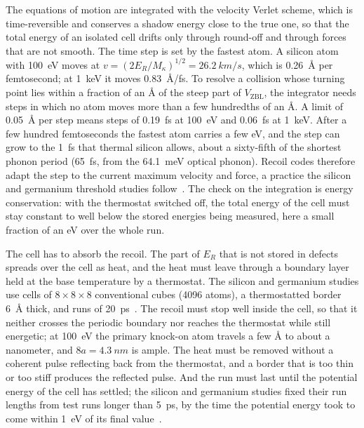 The equations of motion are integrated with the velocity Verlet scheme, which is time-reversible and conserves a shadow energy close to the true one, so that the total energy of an isolated cell drifts only through round-off and through forces that are not smooth. The time step is set by the fastest atom. A silicon atom with \SI{100}{eV} moves at $v = (2E_R/M_\kappa)^{1/2} = \SI{26.2}{km/s}$, which is \SI{0.26}{\angstrom} per femtosecond; at \SI{1}{keV} it moves \SI{0.83}{\angstrom/fs}. To resolve a collision whose turning point lies within a fraction of an \si{\angstrom} of the steep part of $V_{\mathrm{ZBL}}$, the integrator needs steps in which no atom moves more than a few hundredths of an \si{\angstrom}. A limit of \SI{0.05}{\angstrom} per step means steps of \SI{0.19}{fs} at \SI{100}{eV} and \SI{0.06}{fs} at \SI{1}{keV}. After a few hundred femtoseconds the fastest atom carries a few eV, and the step can grow to the \SI{1}{fs} that thermal silicon allows, about a sixty-fifth of the shortest phonon period (\SI{65}{fs}, from the \SI{64.1}{meV} optical phonon). Recoil codes therefore adapt the step to the current maximum velocity and force, a practice the silicon and germanium threshold studies follow~\cite[Table~I]{sassi2022energy}. The check on the integration is energy conservation: with the thermostat switched off, the total energy of the cell must stay constant to well below the stored energies being measured, here a small fraction of an eV over the whole run.

The cell has to absorb the recoil. The part of $E_R$ that is not stored in defects spreads over the cell as heat, and the heat must leave through a boundary layer held at the base temperature by a thermostat. The silicon and germanium studies use cells of $8\times8\times8$ conventional cubes (4096 atoms), a thermostatted border \SI{6}{\angstrom} thick, and runs of \SI{20}{ps}~\cite[Sect.~II\,A and Table~I]{sassi2022energy}. The recoil must stop well inside the cell, so that it neither crosses the periodic boundary nor reaches the thermostat while still energetic; at \SI{100}{eV} the primary knock-on atom travels a few \si{\angstrom} to about a nanometer, and $8a = \SI{4.3}{nm}$ is ample. The heat must be removed without a coherent pulse reflecting back from the thermostat, and a border that is too thin or too stiff produces the reflected pulse. And the run must last until the potential energy of the cell has settled; the silicon and germanium studies fixed their run lengths from test runs longer than \SI{5}{ps}, by the time the potential energy took to come within \SI{1}{eV} of its final value~\cite[Sect.~II\,A]{sassi2022energy}.

